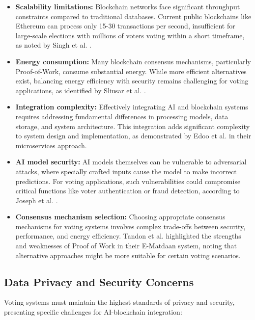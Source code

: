 \documentclass[conference]{IEEEtran}
\begin{document}
\begin{itemize}
    \item \textbf{Scalability limitations:} Blockchain networks face significant throughput constraints compared to traditional databases. Current public blockchains like Ethereum can process only 15-30 transactions per second, insufficient for large-scale elections with millions of voters voting within a short timeframe, as noted by Singh et al. \cite{b5}.
    
    \item \textbf{Energy consumption:} Many blockchain consensus mechanisms, particularly Proof-of-Work, consume substantial energy. While more efficient alternatives exist, balancing energy efficiency with security remains challenging for voting applications, as identified by Sliusar et al. \cite{b4}.
    
    \item \textbf{Integration complexity:} Effectively integrating AI and blockchain systems requires addressing fundamental differences in processing models, data storage, and system architecture. This integration adds significant complexity to system design and implementation, as demonstrated by Edoo et al. \cite{b7} in their microservices approach.
    
    \item \textbf{AI model security:} AI models themselves can be vulnerable to adversarial attacks, where specially crafted inputs cause the model to make incorrect predictions. For voting applications, such vulnerabilities could compromise critical functions like voter authentication or fraud detection, according to Joseph et al. \cite{b6}.
    
    \item \textbf{Consensus mechanism selection:} Choosing appropriate consensus mechanisms for voting systems involves complex trade-offs between security, performance, and energy efficiency. Tandon et al. \cite{b3} highlighted the strengths and weaknesses of Proof of Work in their E-Matdaan system, noting that alternative approaches might be more suitable for certain voting scenarios.
\end{itemize}

\subsection{Data Privacy and Security Concerns}
Voting systems must maintain the highest standards of privacy and security, presenting specific challenges for AI-blockchain integration:
\end{document}
